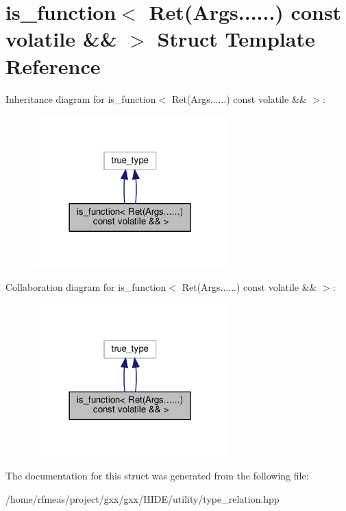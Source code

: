 \hypertarget{structis__function_3_01Ret_07Args_8_8_8_8_8_8_08_01const_01volatile_01_6_6_01_4}{}\section{is\+\_\+function$<$ Ret(Args......) const volatile \&\& $>$ Struct Template Reference}
\label{structis__function_3_01Ret_07Args_8_8_8_8_8_8_08_01const_01volatile_01_6_6_01_4}


Inheritance diagram for is\+\_\+function$<$ Ret(Args......) const volatile \&\& $>$\+:
\nopagebreak
\begin{figure}[H]
\begin{center}
\leavevmode
\includegraphics[width=213pt]{structis__function_3_01Ret_07Args_8_8_8_8_8_8_08_01const_01volatile_01_6_6_01_4__inherit__graph}
\end{center}
\end{figure}


Collaboration diagram for is\+\_\+function$<$ Ret(Args......) const volatile \&\& $>$\+:
\nopagebreak
\begin{figure}[H]
\begin{center}
\leavevmode
\includegraphics[width=213pt]{structis__function_3_01Ret_07Args_8_8_8_8_8_8_08_01const_01volatile_01_6_6_01_4__coll__graph}
\end{center}
\end{figure}


The documentation for this struct was generated from the following file\+:\begin{DoxyCompactItemize}
\item 
/home/rfmeas/project/gxx/gxx/\+H\+I\+D\+E/utility/type\+\_\+relation.\+hpp\end{DoxyCompactItemize}
